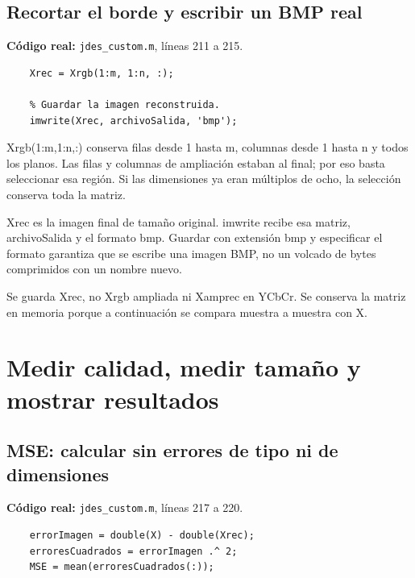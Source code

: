 \documentclass[11pt,a4paper,oneside]{report}
\begin{document}
\par\medskip\noindent\begin{minipage}{\linewidth}

\subsection{Recortar el borde y escribir un BMP real}

\textbf{Código real:} \texttt{jdes\_custom.m}, líneas 211 a 215.

\begin{lstlisting}[firstnumber=211]
    % Eliminar las filas y columnas anadidas al comprimir.
    Xrec = Xrgb(1:m, 1:n, :);

    % Guardar la imagen reconstruida.
    imwrite(Xrec, archivoSalida, 'bmp');
\end{lstlisting}

\end{minipage}\par


Xrgb(1:m,1:n,:) conserva filas desde 1 hasta m, columnas desde 1 hasta n
y todos los planos. Las filas y columnas de ampliación estaban al final;
por eso basta seleccionar esa región. Si las dimensiones ya eran múltiplos
de ocho, la selección conserva toda la matriz.

Xrec es la imagen final de tamaño original. imwrite recibe esa matriz,
archivoSalida y el formato bmp. Guardar con extensión bmp y especificar el
formato garantiza que se escribe una imagen BMP, no un volcado de bytes
comprimidos con un nombre nuevo.

Se guarda Xrec, no Xrgb ampliada ni Xamprec en YCbCr. Se conserva la matriz
en memoria porque a continuación se compara muestra a muestra con X.


\section{Medir calidad, medir tamaño y mostrar resultados}

\par\medskip\noindent\begin{minipage}{\linewidth}

\subsection{MSE: calcular sin errores de tipo ni de dimensiones}

\textbf{Código real:} \texttt{jdes\_custom.m}, líneas 217 a 220.

\begin{lstlisting}[firstnumber=217]
    % PASO 13: calcular el error cuadratico medio.
    errorImagen = double(X) - double(Xrec);
    erroresCuadrados = errorImagen .^ 2;
    MSE = mean(erroresCuadrados(:));
\end{lstlisting}

\end{minipage}\par
\end{document}
